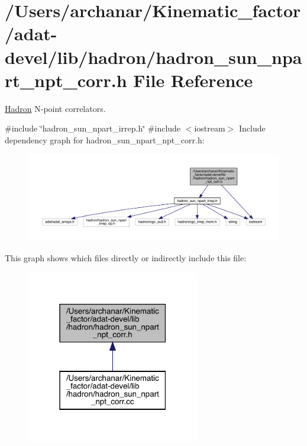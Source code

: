 \hypertarget{adat-devel_2lib_2hadron_2hadron__sun__npart__npt__corr_8h}{}\section{/\+Users/archanar/\+Kinematic\+\_\+factor/adat-\/devel/lib/hadron/hadron\+\_\+sun\+\_\+npart\+\_\+npt\+\_\+corr.h File Reference}
\label{adat-devel_2lib_2hadron_2hadron__sun__npart__npt__corr_8h}


\mbox{\hyperlink{namespaceHadron}{Hadron}} N-\/point correlators.  


{\ttfamily \#include \char`\"{}hadron\+\_\+sun\+\_\+npart\+\_\+irrep.\+h\char`\"{}}\newline
{\ttfamily \#include $<$iostream$>$}\newline
Include dependency graph for hadron\+\_\+sun\+\_\+npart\+\_\+npt\+\_\+corr.\+h\+:
\nopagebreak
\begin{figure}[H]
\begin{center}
\leavevmode
\includegraphics[width=350pt]{dc/d1a/adat-devel_2lib_2hadron_2hadron__sun__npart__npt__corr_8h__incl}
\end{center}
\end{figure}
This graph shows which files directly or indirectly include this file\+:
\nopagebreak
\begin{figure}[H]
\begin{center}
\leavevmode
\includegraphics[width=214pt]{d0/dc3/adat-devel_2lib_2hadron_2hadron__sun__npart__npt__corr_8h__dep__incl}
\end{center}
\end{figure}

